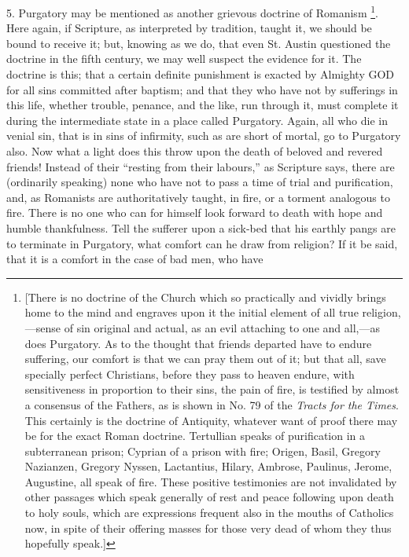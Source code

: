 5. Purgatory may be mentioned as another grievous
doctrine of Romanism \footnote{[There is no doctrine of the Church which so practically and vividly
brings home to the mind and engraves upon it the initial element of
all true religion,—sense of sin original and actual, as an evil
attaching to one and all,—as does Purgatory. As to the thought that
friends departed have to endure suffering, our comfort is that we can
pray them out of it; but that all, save specially perfect Christians,
before they pass to heaven endure, with sensitiveness in proportion to
their sins, the pain of fire, is testified by almost a consensus of
the Fathers, as is shown in No. 79 of the \emph{Tracts for the Times}.
This certainly is the doctrine of Antiquity, whatever want of proof
there may be for the exact Roman doctrine. Tertullian speaks of
purification in a subterranean prison; Cyprian of a prison with fire;
Origen, Basil, Gregory Nazianzen, Gregory Nyssen, Lactantius, Hilary,
Ambrose, Paulinus, Jerome, Augustine, all speak of fire. These
positive testimonies are not invalidated by other passages which speak
generally of rest and peace following upon death to holy souls, which
are expressions frequent also in the mouths of Catholics now, in spite
of their offering masses for those very dead of whom they thus
hopefully speak.]}.
Here again, if Scripture, as interpreted by tradition, taught it, we
should be bound to receive it; but, knowing as we do, that even St.
Austin questioned the doctrine in the fifth century, we may well
suspect the evidence for it. The doctrine is this; that a certain
definite punishment is exacted by Almighty GOD
for all sins committed after baptism; and that they who have not by
sufferings in this life, whether trouble, penance, and the like, run
through it, must complete it during the intermediate state in a place
called Purgatory. Again, all who die in venial sin, that is in sins of
infirmity, such as are short of mortal, go to Purgatory also.
Now what a light does this throw upon the death of beloved and revered
friends! Instead of their ``resting from their labours,'' as Scripture
says, there are (ordinarily speaking) none who have not to pass a time
of trial and purification, and, as Romanists are authoritatively
taught, in fire, or a torment analogous to fire. There is no one who
can for himself look forward to death with hope and humble
thankfulness. Tell the sufferer upon a sick-bed that his earthly pangs
are to terminate in Purgatory, what comfort can he draw from religion?
If it be said, that it is a comfort in the case of bad men, who have
